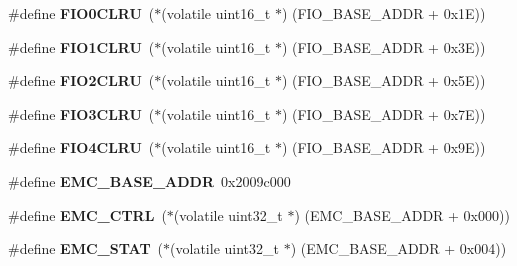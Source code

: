 \begin{DoxyCompactItemize}
\mbox{\label{group__lpc24xx__regs_ga495687da44a467aa43994a1637b800d3}} 
\#define {\bfseries F\+I\+O0\+C\+L\+RU}~($\ast$(volatile uint16\+\_\+t $\ast$) (F\+I\+O\+\_\+\+B\+A\+S\+E\+\_\+\+A\+D\+DR + 0x1\+E))
\item 
\mbox{\label{group__lpc24xx__regs_gad823c094a473b08ecab428d19496b143}} 
\#define {\bfseries F\+I\+O1\+C\+L\+RU}~($\ast$(volatile uint16\+\_\+t $\ast$) (F\+I\+O\+\_\+\+B\+A\+S\+E\+\_\+\+A\+D\+DR + 0x3\+E))
\item 
\mbox{\label{group__lpc24xx__regs_ga42aa185aba0147616e65fea1d4a4143a}} 
\#define {\bfseries F\+I\+O2\+C\+L\+RU}~($\ast$(volatile uint16\+\_\+t $\ast$) (F\+I\+O\+\_\+\+B\+A\+S\+E\+\_\+\+A\+D\+DR + 0x5\+E))
\item 
\mbox{\label{group__lpc24xx__regs_gac5cbd019dd9f2b972ef4ba7cd2d72a76}} 
\#define {\bfseries F\+I\+O3\+C\+L\+RU}~($\ast$(volatile uint16\+\_\+t $\ast$) (F\+I\+O\+\_\+\+B\+A\+S\+E\+\_\+\+A\+D\+DR + 0x7\+E))
\item 
\mbox{\label{group__lpc24xx__regs_ga4b4c7048ecc54896e2633e1682f44074}} 
\#define {\bfseries F\+I\+O4\+C\+L\+RU}~($\ast$(volatile uint16\+\_\+t $\ast$) (F\+I\+O\+\_\+\+B\+A\+S\+E\+\_\+\+A\+D\+DR + 0x9\+E))
\item 
\mbox{\label{group__lpc24xx__regs_gab001a5ecd9b443f598529d69687500d5}} 
\#define {\bfseries E\+M\+C\+\_\+\+B\+A\+S\+E\+\_\+\+A\+D\+DR}~0x2009c000
\item 
\mbox{\label{group__lpc24xx__regs_ga0ee4542f655dbe2d13a52dfe57f78fc1}} 
\#define {\bfseries E\+M\+C\+\_\+\+C\+T\+RL}~($\ast$(volatile uint32\+\_\+t $\ast$) (E\+M\+C\+\_\+\+B\+A\+S\+E\+\_\+\+A\+D\+DR + 0x000))
\item 
\mbox{\label{group__lpc24xx__regs_ga4603ffb9899622ffcf7c5ac9131da819}} 
\#define {\bfseries E\+M\+C\+\_\+\+S\+T\+AT}~($\ast$(volatile uint32\+\_\+t $\ast$) (E\+M\+C\+\_\+\+B\+A\+S\+E\+\_\+\+A\+D\+DR + 0x004))
\item 
\mbox{\label{group__lpc24xx__regs_gaa7028917f44454d49d10c870e61055ec}} 

\end{DoxyCompactItemize}
